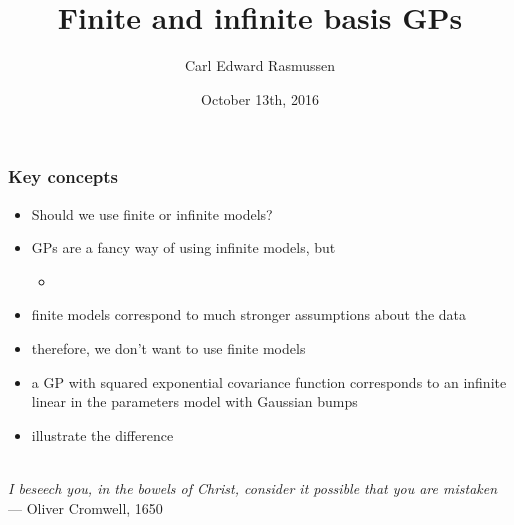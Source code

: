 

\title{Finite and infinite basis GPs}
\author{Carl Edward Rasmussen}
\date{October 13th, 2016}



\begin{frame}
\titlepage
\end{frame}

\begin{frame}
\frametitle{Key concepts}

\begin{itemize}
\item Should we use finite or infinite models?
\item GPs are a fancy way of using infinite models, but
\begin{itemize}
\item {}
\end{itemize}
\item finite models correspond to much stronger assumptions about the data
\item therefore, we don't want to use finite models
\item a GP with squared exponential covariance function corresponds to
  an infinite linear in the parameters model with Gaussian bumps
\item illustrate the difference\\[2ex]
\end{itemize}



\\
\emph{I beseech you, in the bowels of Christ, consider it possible that you are
  mistaken}\\
\mbox{}\hfill --- Oliver Cromwell, 1650
\end{frame}



